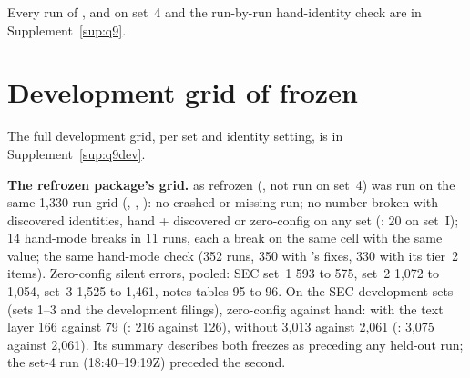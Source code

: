 




Every run of ,  and  on set~4 and the run-by-run hand-identity check are in Supplement~\ref{sup:q9}.

\section{Development grid of frozen }\label{app:q9dev}



The full development grid, per set and identity setting, is in Supplement~\ref{sup:q9dev}.

\textbf{The refrozen package's grid.}  as refrozen (, not run on set~4) was run on the same 1,330-run grid (, , ): no crashed or missing run; no number broken with discovered identities, hand + discovered or zero-config on any set (: 20 on set~I); 14 hand-mode breaks in 11 runs, each a  break on the same cell with the same value; the same hand-mode check (352 runs, 350 with 's fixes, 330 with its tier~2 items). Zero-config silent errors, pooled: SEC set~1 593 to 575, set~2 1,072 to 1,054, set~3 1,525 to 1,461, notes tables 95 to 96. On the SEC development sets (sets 1--3 and the development filings), zero-config against hand: with the text layer 166 against 79 (: 216 against 126), without 3,013 against 2,061 (: 3,075 against 2,061). Its summary describes both freezes as preceding any held-out run; the set-4 run (18:40--19:19Z) preceded the second.

